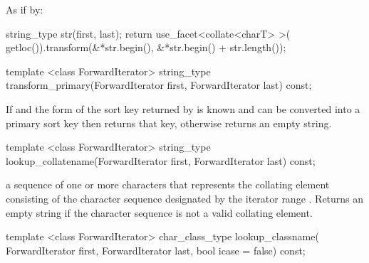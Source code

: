 \begin{itemdescr}
\pnum\effects
As if by:
\begin{codeblock}
string_type str(first, last);
return use_facet<collate<charT> >(
  getloc()).transform(&*str.begin(), &*str.begin() + str.length());
\end{codeblock}
\end{itemdescr}

%
%
\begin{itemdecl}
template <class ForwardIterator>
  string_type transform_primary(ForwardIterator first, ForwardIterator last) const; 
\end{itemdecl}

\begin{itemdescr}
\pnum\effects If 
and the form of the sort key returned
by  is known and
can be converted into a primary sort key then returns that key,
otherwise returns an empty string.
\end{itemdescr}

%
%
\begin{itemdecl}
template <class ForwardIterator>
  string_type lookup_collatename(ForwardIterator first, ForwardIterator last) const; 
\end{itemdecl}

\begin{itemdescr}
\pnum\returns  a sequence of one or more characters that
represents the collating element consisting of the character
sequence designated by the iterator range .
Returns an empty string if the character sequence is not a
valid collating element.
\end{itemdescr}

%
%
\begin{itemdecl}
template <class ForwardIterator>
  char_class_type lookup_classname(
    ForwardIterator first, ForwardIterator last, bool icase = false) const; 
\end{itemdecl}

